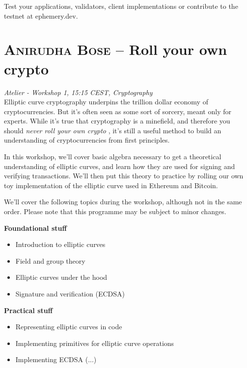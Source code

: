 Test your applications, validators, client implementations or contribute to the testnet at ephemery.dev.
\clearpage
\section {\textsc{Anirudha Bose} -- Roll your own crypto
} \noindent \textit {Atelier - Workshop 1, 15:15 CEST, Cryptography
}\\[1em] Elliptic curve cryptography underpins the trillion dollar economy of cryptocurrencies. But it's often seen as some sort of sorcery, meant only for experts. While it's true that cryptography is a minefield, and therefore you should \emph{never roll your own crypto}
, it's still a useful method to build an understanding of cryptocurrencies from first principles.

In this workshop, we'll cover basic algebra necessary to get a theoretical understanding of elliptic curves, and learn how they are used for signing and verifying transactions. We'll then put this theory to practice by rolling our own toy implementation of the elliptic curve used in Ethereum and Bitcoin.
\par We'll cover the following topics during the workshop, although not in the same order. Please note that this programme may be subject to minor changes.

\textbf{Foundational stuff}

\begin{itemize}
\item Introduction to elliptic curves
\item Field and group theory
\item Elliptic curves under the hood
\item Signature and verification (ECDSA)
\end{itemize}

\textbf{Practical stuff}

\begin{itemize}
\item Representing elliptic curves in code
\item Implementing primitives for elliptic curve operations
\item Implementing ECDSA (...)
\end{itemize}

\clearpage
